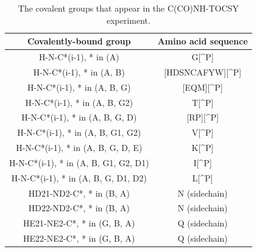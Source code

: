 \begin{table}
  \begin{tabular}{ | c | c | }
    \hline
    Covalently-bound group         &  Amino acid sequence  \\  \hline
    H-N-C*(i-1), * in (A)               &  G[\^{}P]             \\  \hline
    H-N-C*(i-1), * in (A, B)            &  [HDSNCAFYW][\^{}P]   \\  \hline
    H-N-C*(i-1), * in (A, B, G)         &  [EQM][\^{}P]         \\  \hline
    H-N-C*(i-1), * in (A, B, G2)        &  T[\^{}P]             \\  \hline
    H-N-C*(i-1), * in (A, B, G, D)      &  [RP][\^{}P]          \\  \hline
    H-N-C*(i-1), * in (A, B, G1, G2)    &  V[\^{}P]             \\  \hline
    H-N-C*(i-1), * in (A, B, G, D, E)   &  K[\^{}P]             \\  \hline
    H-N-C*(i-1), * in (A, B, G1, G2, D1)&  I[\^{}P]             \\  \hline
    H-N-C*(i-1), * in (A, B, G, D1, D2) &  L[\^{}P]             \\  \hline
    HD21-ND2-C*, * in (B, A)            &  N (sidechain)            \\  \hline
    HD22-ND2-C*, * in (B, A)            &  N (sidechain)            \\  \hline
    HE21-NE2-C*, * in (G, B, A)         &  Q (sidechain)            \\  \hline
    HE22-NE2-C*, * in (G, B, A)         &  Q (sidechain)            \\  \hline
  \end{tabular}
  \caption{The covalent groups that appear in the C(CO)NH-TOCSY experiment.}
  \label{cconh_peaktypes}
\end{table}

